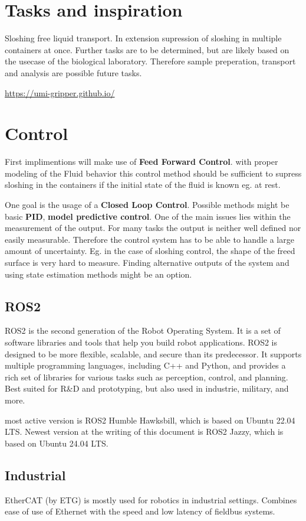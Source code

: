 \documentclass{ltxdockit}
\begin{document}
\section{Tasks and inspiration}
\label{sec:tasks}
Sloshing free liquid transport. In extension supression of sloshing in multiple containers at once. Further tasks are to be determined, but are likely based on the usecase of the biological laboratory. Therefore sample preperation, transport and analysis are possible future tasks.

\url{https://umi-gripper.github.io/}


\section{Control}
\label{sec:Control}
First implimentions will make use of \textbf{Feed Forward Control}. with proper modeling of the Fluid behavior this control method should be sufficient to supress sloshing in the containers if the initial state of the fluid is known eg. at rest. 

One goal is the usage of a \textbf{Closed Loop Control}. Possible methods might be basic \textbf{PID}, \textbf{model predictive control}. One of the main issues lies within the measurement of the output. For many tasks the output is neither well defined nor easily measurable. Therefore the control system has to be able to handle a large amount of uncertainty. Eg. in the case of sloshing control, the shape of the freed surface is very hard to measure. Finding alternative outputs of the system and using state estimation methods might be an option. 

\subsection{ROS2}
\label{sec:Control:ROS2}

ROS2 is the second generation of the Robot Operating System. It is a set of software libraries and tools that help you build robot applications. ROS2 is designed to be more flexible, scalable, and secure than its predecessor. It supports multiple programming languages, including C++ and Python, and provides a rich set of libraries for various tasks such as perception, control, and planning. Best suited for R\&D and prototyping, but also used in industrie, military, and more.

most active version is ROS2 Humble Hawksbill, which is based on Ubuntu 22.04 LTS. Newest version at the writing of this document is ROS2 Jazzy, which is based on Ubuntu 24.04 LTS. 

\subsection{Industrial}
EtherCAT (by ETG) is mostly used for robotics in industrial settings. Combines ease of use of Ethernet with the speed and low latency of fieldbus systems.




\printbibliography
\end{document}
